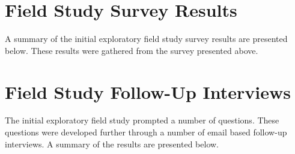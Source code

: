 \begin{center}
\end{center}

\chapter{Field Study Survey Results}

A summary of the initial exploratory field study survey results are presented below. These results were gathered from the survey presented above.

\chapter{Field Study Follow-Up Interviews}

The initial exploratory field study prompted a number of questions. These questions were developed further through a number of email based follow-up interviews. A summary of the results are presented below.

